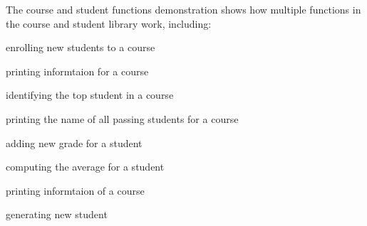 The course and student functions demonstration shows how multiple functions in the course and student library work, including\+:
\begin{DoxyItemize}
\item enrolling new students to a course
\item printing informtaion for a course
\item identifying the top student in a course
\item printing the name of all passing students for a course
\item adding new grade for a student
\item computing the average for a student
\item printing informtaion of a course
\item generating new student 
\end{DoxyItemize}